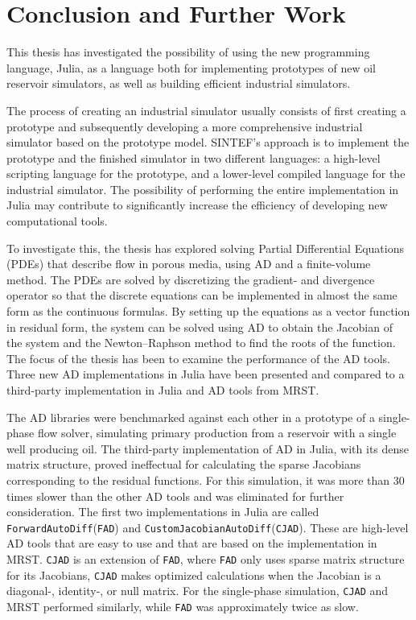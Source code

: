 \chapter{Conclusion and Further Work}
\label{ch:Conclusion}
This thesis has investigated the possibility of using the new programming language, Julia, as a language both for implementing prototypes of new oil reservoir simulators, as well as building efficient industrial simulators. 

The process of creating an industrial simulator usually consists of first creating a prototype and subsequently developing a more comprehensive industrial simulator based on the prototype model. SINTEF's approach is to implement the prototype and the finished simulator in two different languages: a high-level scripting language for the prototype, and a lower-level compiled language for the industrial simulator. The possibility of performing the entire implementation in Julia may contribute to significantly increase the efficiency of developing new computational tools.

To investigate this, the thesis has explored solving Partial Differential Equations (PDEs) that describe flow in porous media, using AD and a finite-volume method. The PDEs are solved by discretizing the gradient- and divergence operator so that the discrete equations can be implemented in almost the same form as the continuous formulas. By setting up the equations as a vector function in residual form, the system can be solved using AD to obtain the Jacobian of the system and the Newton--Raphson method to find the roots of the function. The focus of the thesis has been to examine the performance of the AD tools. Three new AD implementations in Julia have been presented and compared to a third-party implementation in Julia and AD tools from MRST. 

The AD libraries were benchmarked against each other in a prototype of a single-phase flow solver, simulating primary production from a reservoir with a single well producing oil. The third-party implementation of AD in Julia, with its dense matrix structure, proved ineffectual for calculating the sparse Jacobians corresponding to the residual functions. For this simulation, it was more than 30 times slower than the other AD tools and was eliminated for further consideration. The first two implementations in Julia are called \texttt{ForwardAutoDiff}(\texttt{FAD}) and \texttt{CustomJacobianAutoDiff}(\texttt{CJAD}). These are high-level AD tools that are easy to use and that are based on the implementation in MRST. \texttt{CJAD} is an extension of \texttt{FAD}, where \texttt{FAD} only uses sparse matrix structure for its Jacobians, \texttt{CJAD} makes optimized calculations when the Jacobian is a diagonal-, identity-, or null matrix. For the single-phase simulation, \texttt{CJAD} and MRST performed similarly, while \texttt{FAD} was approximately twice as slow. 


